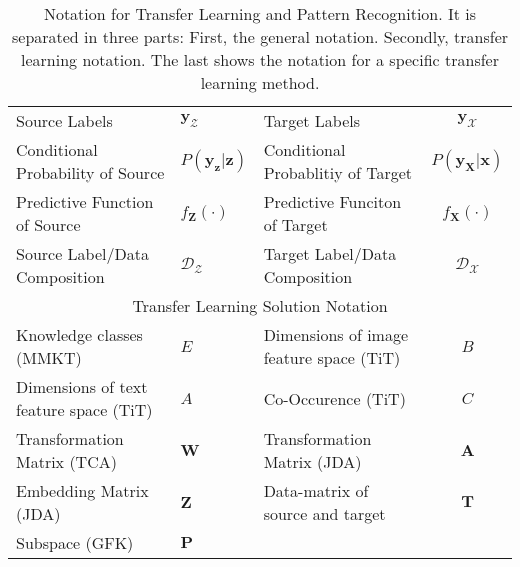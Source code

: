 \begin{table}[]
{\begin{tabular}{@{}lclc@{}}
		Source Labels                          & \multicolumn{1}{l|}{$\mathbf{y}_\mathcal{Z}$}      & Target Labels                                         & $\mathbf{y}_\mathcal{X}$      \\
		Conditional Probability of Source      & \multicolumn{1}{l|}{$P(\mathbf{y}_\mathbf{z}\vert\mathbf{z})$} & Conditional Probablitiy of Target                     & $P(\mathbf{y}_\mathbf{X}\vert\mathbf{x})$ \\
		Predictive Function of Source          & \multicolumn{1}{l|}{$f_\mathbf{Z}(\cdot)$}    & Predictive Funciton of Target                         & $f_\mathbf{X}(\cdot)$    \\
		Source Label/Data Composition          & \multicolumn{1}{l|}{$\mathcal{D_Z}$}      & Target Label/Data Composition                         & $\mathcal{D_X}$        \\ \midrule
		\multicolumn{4}{c}{Transfer Learning Solution Notation}                                                                                 \\ \midrule
		Knowledge classes (MMKT)               & \multicolumn{1}{l|}{$E$}       & Dimensions of image feature space (TiT)               & $B$       \\
		Dimensions of text feature space (TiT) & \multicolumn{1}{l|}{$A$}       & Co-Occurence (TiT)                                    & $C$ \\
		Transformation Matrix (TCA) & \multicolumn{1}{l|}{$\mathbf{W}$ }   & Transformation Matrix (JDA)   & $\mathbf{A}$   \\
		Embedding Matrix (JDA) & \multicolumn{1}{l|}{$\mathbf{Z}$ }  & Data-matrix of source and target & $\mathbf{T}$ \\
		 Subspace (GFK) &  \multicolumn{1}{l|}{$\mathbf{P}$}  \\\bottomrule
	\end{tabular}}
	\caption[Notation of Transfer Learning]{Notation for Transfer Learning and Pattern Recognition. It is separated in three parts: First, the general notation. Secondly, transfer learning notation. The last shows the notation for a specific transfer learning method. \label{ATableNotation}}

\end{table}
\FloatBarrier
